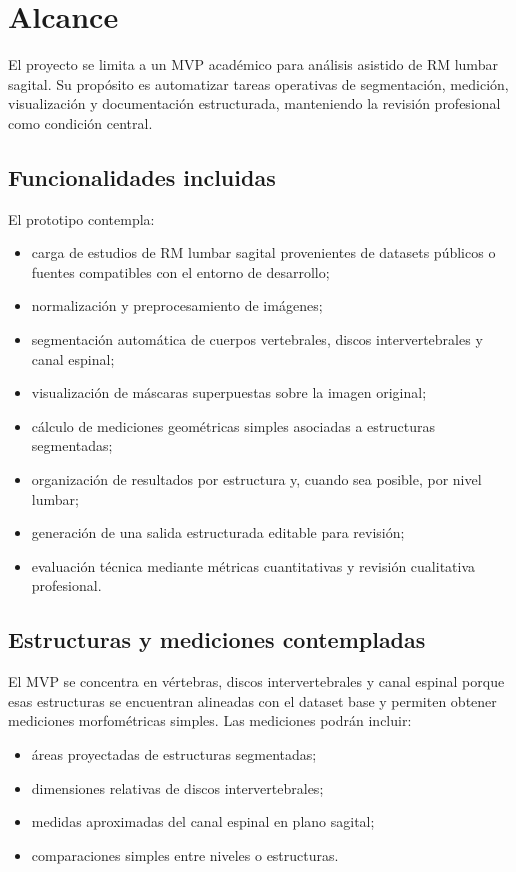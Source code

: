 \chapter{Alcance}

El proyecto se limita a un MVP acad\'emico para an\'alisis asistido de RM lumbar sagital. Su prop\'osito es automatizar tareas operativas de segmentaci\'on, medici\'on, visualizaci\'on y documentaci\'on estructurada, manteniendo la revisi\'on profesional como condici\'on central.

\section{Funcionalidades incluidas}

El prototipo contempla:

\begin{itemize}
    \item carga de estudios de RM lumbar sagital provenientes de datasets p\'ublicos o fuentes compatibles con el entorno de desarrollo;
    \item normalizaci\'on y preprocesamiento de im\'agenes;
    \item segmentaci\'on autom\'atica de cuerpos vertebrales, discos intervertebrales y canal espinal;
    \item visualizaci\'on de m\'ascaras superpuestas sobre la imagen original;
    \item c\'alculo de mediciones geom\'etricas simples asociadas a estructuras segmentadas;
    \item organizaci\'on de resultados por estructura y, cuando sea posible, por nivel lumbar;
    \item generaci\'on de una salida estructurada editable para revisi\'on;
    \item evaluaci\'on t\'ecnica mediante m\'etricas cuantitativas y revisi\'on cualitativa profesional.
\end{itemize}

\section{Estructuras y mediciones contempladas}

El MVP se concentra en v\'ertebras, discos intervertebrales y canal espinal porque esas estructuras se encuentran alineadas con el dataset base y permiten obtener mediciones morfom\'etricas simples. Las mediciones podr\'an incluir:

\begin{itemize}
    \item \'areas proyectadas de estructuras segmentadas;
    \item dimensiones relativas de discos intervertebrales;
    \item medidas aproximadas del canal espinal en plano sagital;
    \item comparaciones simples entre niveles o estructuras.
\end{itemize}

